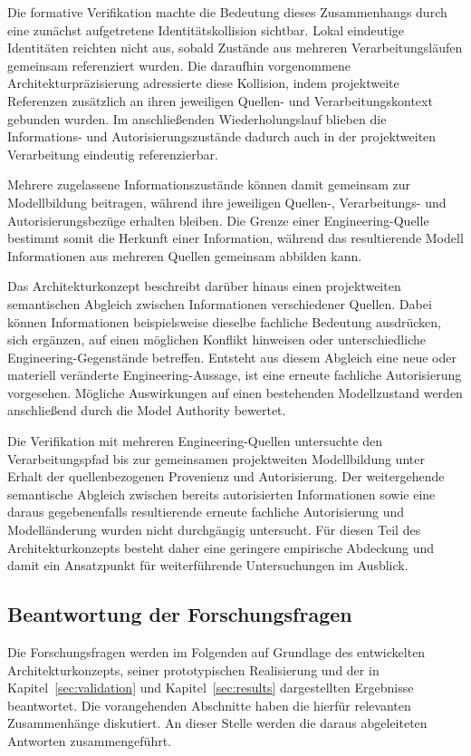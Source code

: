 Die formative Verifikation machte die Bedeutung dieses Zusammenhangs durch
eine zunächst aufgetretene Identitätskollision sichtbar. Lokal eindeutige
Identitäten reichten nicht aus, sobald Zustände aus mehreren
Verarbeitungsläufen gemeinsam referenziert wurden. Die daraufhin
vorgenommene Architekturpräzisierung adressierte diese Kollision, indem
projektweite Referenzen zusätzlich an ihren jeweiligen Quellen- und
Verarbeitungskontext gebunden wurden. Im anschließenden Wiederholungslauf
blieben die Informations- und Autorisierungszustände dadurch auch in der
projektweiten Verarbeitung eindeutig referenzierbar.

Mehrere zugelassene Informationszustände können damit gemeinsam zur
Modellbildung beitragen, während ihre jeweiligen Quellen-, Verarbeitungs-
und Autorisierungsbezüge erhalten bleiben. Die Grenze einer
Engineering-Quelle bestimmt somit die Herkunft einer Information, während
das resultierende Modell Informationen aus mehreren Quellen gemeinsam
abbilden kann.

Das Architekturkonzept beschreibt darüber hinaus einen projektweiten
semantischen Abgleich zwischen Informationen verschiedener Quellen. Dabei
können Informationen beispielsweise dieselbe fachliche Bedeutung ausdrücken,
sich ergänzen, auf einen möglichen Konflikt hinweisen oder unterschiedliche
Engineering-Gegenstände betreffen. Entsteht aus diesem Abgleich eine neue
oder materiell veränderte Engineering-Aussage, ist eine erneute fachliche
Autorisierung vorgesehen. Mögliche Auswirkungen auf einen bestehenden
Modellzustand werden anschließend durch die Model Authority bewertet.

Die Verifikation mit mehreren Engineering-Quellen untersuchte den
Verarbeitungspfad bis zur gemeinsamen projektweiten Modellbildung unter
Erhalt der quellenbezogenen Provenienz und Autorisierung. Der weitergehende
semantische Abgleich zwischen bereits autorisierten Informationen sowie eine
daraus gegebenenfalls resultierende erneute fachliche Autorisierung und
Modelländerung wurden nicht durchgängig untersucht. Für diesen Teil des
Architekturkonzepts besteht daher eine geringere empirische Abdeckung und
damit ein Ansatzpunkt für weiterführende Untersuchungen im Ausblick.
\newpage
\subsection{Beantwortung der Forschungsfragen}
\label{sec:discussion_research_questions}

Die Forschungsfragen werden im Folgenden auf Grundlage des entwickelten
Architekturkonzepts, seiner prototypischen Realisierung und der in
Kapitel~\ref{sec:validation} und Kapitel~\ref{sec:results} dargestellten
Ergebnisse beantwortet. Die vorangehenden Abschnitte haben die hierfür
relevanten Zusammenhänge diskutiert. An dieser Stelle werden die daraus
abgeleiteten Antworten zusammengeführt.


